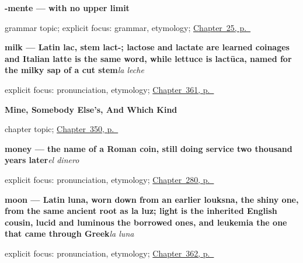 \noindent\begin{minipage}[t]{\linewidth}
\raggedright
\textbf{-mente — with no upper limit}\par
\footnotesize grammar topic; explicit focus: grammar, etymology; \hyperref[ch:friend-mente]{Chapter~25, p.~\pageref*{ch:friend-mente}}
\end{minipage}\par\smallskip

\noindent\begin{minipage}[t]{\linewidth}
\raggedright
\textbf{milk — Latin lac, stem lact-; lactose and lactate are learned coinages and Italian latte is the same word, while lettuce is lactūca, named for the milky sap of a cut stem}\enspace\emph{la leche}\par
\footnotesize explicit focus: pronunciation, etymology; \hyperref[ch:la-carne-y-la-leche]{Chapter~361, p.~\pageref*{ch:la-carne-y-la-leche}}
\end{minipage}\par\smallskip

\noindent\begin{minipage}[t]{\linewidth}
\raggedright
\textbf{Mine, Somebody Else's, And Which Kind}\par
\footnotesize chapter topic; \hyperref[ch:propio-y-ajeno]{Chapter~350, p.~\pageref*{ch:propio-y-ajeno}}
\end{minipage}\par\smallskip

\noindent\begin{minipage}[t]{\linewidth}
\raggedright
\textbf{money — the name of a Roman coin, still doing service two thousand years later}\enspace\emph{el dinero}\par
\footnotesize explicit focus: pronunciation, etymology; \hyperref[ch:la-compra]{Chapter~280, p.~\pageref*{ch:la-compra}}
\end{minipage}\par\smallskip

\noindent\begin{minipage}[t]{\linewidth}
\raggedright
\textbf{moon — Latin luna, worn down from an earlier louksna, the shiny one, from the same ancient root as la luz; light is the inherited English cousin, lucid and luminous the borrowed ones, and leukemia the one that came through Greek}\enspace\emph{la luna}\par
\footnotesize explicit focus: pronunciation, etymology; \hyperref[ch:la-tierra-y-el-mar]{Chapter~362, p.~\pageref*{ch:la-tierra-y-el-mar}}
\end{minipage}\par\smallskip

